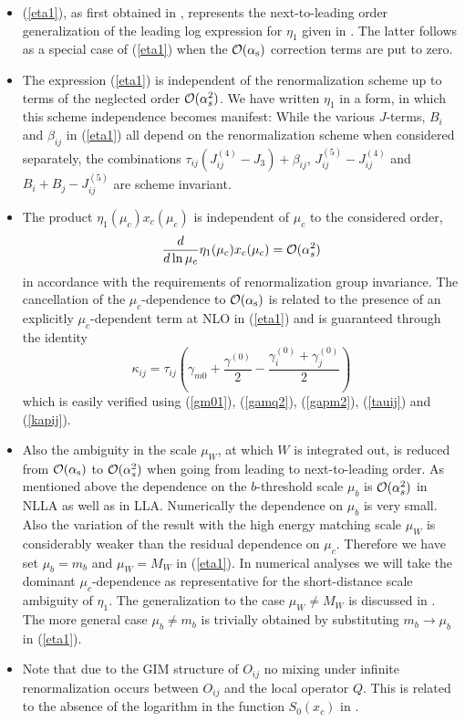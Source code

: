 \begin{itemize}
\item
(\ref{eta1}), as first obtained in \cite{herrlichnierste:93}, represents the
next-to-leading order generalization of the leading log expression
for $\eta_1$ given in \cite{gilmanwise:83}. The latter follows as a
special case of (\ref{eta1}) when the ${\cal O}(\alpha_{\rm s})$ correction
terms are put to zero.
\item
The expression (\ref{eta1}) is independent of the renormalization
scheme up to terms of the neglected order ${\cal O}(\alpha^2_s)$.
We have written $\eta_1$ in a form, in which this scheme
independence becomes manifest: While the various $J$-terms, $B_i$ and
$\beta_{ij}$ in (\ref{eta1}) all depend on the renormalization
scheme when considered separately, the combinations
$\tau_{ij}(J^{(4)}_{ij}-J_3)+\beta_{ij}$,
$J^{(5)}_{ij}-J^{(4)}_{ij}$ and $B_i+B_j-J^{(5)}_{ij}$
are scheme invariant.
\item
The product $\eta_1(\mu_c) x_c(\mu_c)$ is independent of $\mu_c$
to the considered order,
\begin{equation}
\frac{d}{d\ln\mu_c}\eta_1(\mu_c) x_c(\mu_c)={\cal O}(\alpha^2_s)
\end{equation}
in accordance with the requirements of renormalization group
invariance. The cancellation of the $\mu_c$-dependence to
${\cal O}(\alpha_{\rm s})$ is related to the presence of an explicitly
$\mu_c$-dependent term at NLO in (\ref{eta1}) and is
guaranteed through the identity
\begin{equation}\label{kapid}
\kappa_{ij}=\tau_{ij}\left(\gamma_{m0}+\frac{\gamma^{(0)}}{2}-
\frac{\gamma^{(0)}_i+\gamma^{(0)}_j}{2}\right)
\end{equation}
which is easily verified using (\ref{gm01}), (\ref{gamq2}),
(\ref{gapm2}), (\ref{tauij}) and (\ref{kapij}).
\item
Also the ambiguity in the scale $\mu_W$, at which $W$ is integrated out,
is reduced from ${\cal O}(\alpha_{\rm s})$ to ${\cal O}(\alpha^2_s)$
when going from leading to next-to-leading order. As mentioned
above the dependence on the $b$-threshold scale $\mu_b$ is
${\cal O}(\alpha^2_s)$ in NLLA as well as in LLA.
Numerically the dependence on $\mu_b$ is very small. Also the
variation of the result with the high energy matching scale $\mu_W$
is considerably weaker than the residual dependence on $\mu_c$.
Therefore we have set $\mu_b=m_b$ and $\mu_W=M_W$ in (\ref{eta1}).
In numerical analyses we will take the dominant $\mu_c$-dependence
as representative for the short-distance scale ambiguity of $\eta_1$.
The generalization to the case $\mu_W\not= M_W$ is discussed in
\cite{herrlichnierste:93}. The more general case $\mu_b\not= m_b$ is trivially
obtained by substituting $m_b\to\mu_b$ in (\ref{eta1}).
\item
Note that due to the GIM structure of $O_{ij}$ no mixing under infinite
renormalization occurs between $O_{ij}$ and the local operator $Q$.
This is related to the absence of the logarithm in the function
$S_0(x_c)$ in .
\end{itemize}
